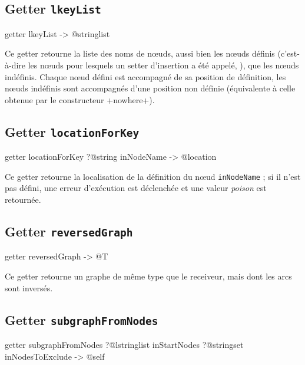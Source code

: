 \subsection{Getter \texttt{lkeyList}}

\begin{galgas}
getter lkeyList -> @stringlist 
\end{galgas}

Ce getter retourne la liste des noms de nœuds, aussi bien les nœuds définis (c'est-à-dire les nœuds pour lesquels un setter d'insertion a été appelé, ), que les nœuds indéfinis. Chaque nœud défini est accompagné de sa position de définition, les nœuds indéfinis sont accompagnés d'une position non définie (équivalente à celle obtenue par le constructeur \ggs+nowhere+).






\subsection{Getter \texttt{locationForKey}}

\begin{galgas}
getter locationForKey ?@string inNodeName -> @location
\end{galgas}

Ce getter retourne la localisation de la définition du nœud \texttt{inNodeName} ; si il n'est pas défini, une erreur d'exécution est déclenchée et une valeur \emph{poison} est retournée.



\subsection{Getter \texttt{reversedGraph}}

\begin{galgas}
getter reversedGraph -> @T 
\end{galgas}

Ce getter retourne un graphe de même type que le receiveur, mais dont les arcs sont inversés.





\subsection{Getter \texttt{subgraphFromNodes}}

\begin{galgas}
getter subgraphFromNodes
  ?@lstringlist inStartNodes
  ?@stringset inNodesToExclude
  -> @self 
\end{galgas}

